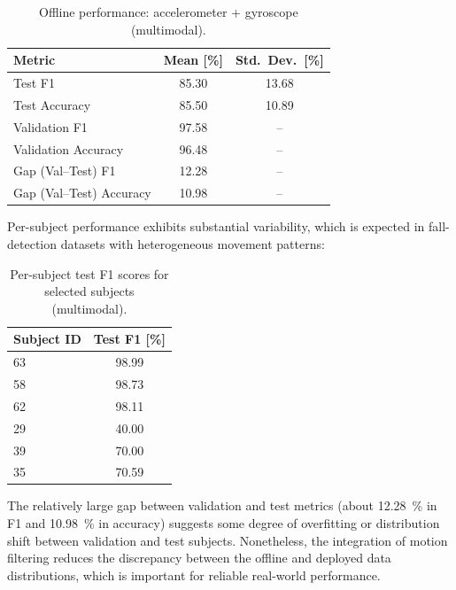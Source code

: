 \begin{table}[h]
    \centering
    \caption{Offline performance: accelerometer + gyroscope (multimodal).}
    \label{tab:imu_multi}
    \begin{tabular}{lcc}
        \toprule
        Metric & Mean [\%] & Std.\ Dev.\ [\%] \\
        \midrule
        Test F1          & 85.30 & 13.68 \\
        Test Accuracy    & 85.50 & 10.89 \\
        Validation F1    & 97.58 & --    \\
        Validation Accuracy & 96.48 & -- \\
        \midrule
        Gap (Val--Test) F1   & 12.28 & -- \\
        Gap (Val--Test) Accuracy & 10.98 & -- \\
        \bottomrule
    \end{tabular}
\end{table}

Per-subject performance exhibits substantial variability, which is expected in fall-detection datasets with heterogeneous movement patterns:

\begin{table}[h]
    \centering
    \caption{Per-subject test F1 scores for selected subjects (multimodal).}
    \label{tab:subject_f1}
    \begin{tabular}{lc}
        \toprule
        Subject ID & Test F1 [\%] \\
        \midrule
        63 & 98.99 \\
        58 & 98.73 \\
        62 & 98.11 \\
        \midrule
        29 & 40.00 \\
        39 & 70.00 \\
        35 & 70.59 \\
        \bottomrule
    \end{tabular}
\end{table}

The relatively large gap between validation and test metrics (about \SI{12.28}{\percent} in F1 and \SI{10.98}{\percent} in accuracy) suggests some degree of overfitting or distribution shift between validation and test subjects. Nonetheless, the integration of motion filtering reduces the discrepancy between the offline and deployed data distributions, which is important for reliable real-world performance.

